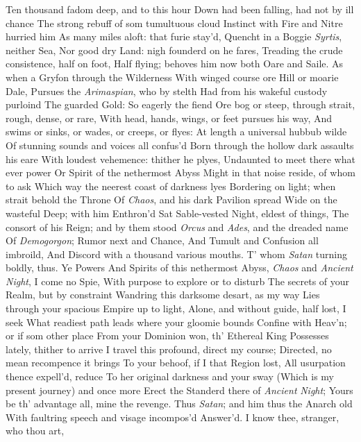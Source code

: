 \documentclass[11pt]{book}
\begin{document}
Ten thousand fadom deep, and to this hour 
Down had been falling, had not by ill chance 
The strong rebuff of som tumultuous cloud 
Instinct with Fire and Nitre hurried him 
As many miles aloft: that furie stay'd, 
Quencht in a Boggie \textit{Syrtis}, neither Sea, 
Nor good dry Land: nigh founderd on he fares, 
Treading the crude consistence, half on foot, 
Half flying; behoves him now both Oare and Saile. 
As when a Gryfon through the Wilderness 
With winged course ore Hill or moarie Dale, 
Pursues the \textit{Arimaspian}, who by stelth 
Had from his wakeful custody purloind 
The guarded Gold: So eagerly the fiend 
Ore bog or steep, through strait, rough, dense, or rare, 
With head, hands, wings, or feet pursues his way, 
And swims or sinks, or wades, or creeps, or flyes: 
At length a universal hubbub wilde 
Of stunning sounds and voices all confus'd 
Born through the hollow dark assaults his eare 
With loudest vehemence: thither he plyes, 
Undaunted to meet there what ever power 
Or Spirit of the nethermost Abyss 
Might in that noise reside, of whom to ask 
Which way the neerest coast of darkness lyes 
Bordering on light; when strait behold the Throne 
Of \textit{Chaos}, and his dark Pavilion spread 
Wide on the wasteful Deep; with him Enthron'd 
Sat Sable-vested Night, eldest of things, 
The consort of his Reign; and by them stood 
\textit{Orcus} and \textit{Ades}, and the dreaded name 
Of \textit{Demogorgon}; Rumor next and Chance, 
And Tumult and Confusion all imbroild, 
And Discord with a thousand various mouths. 
\quad T' whom \textit{Satan} turning boldly, thus.  Ye Powers 
And Spirits of this nethermost Abyss, 
\textit{Chaos} and \textit{Ancient} \textit{Night}, I come no Spie, 
With purpose to explore or to disturb 
The secrets of your Realm, but by constraint 
Wandring this darksome desart, as my way 
Lies through your spacious Empire up to light, 
Alone, and without guide, half lost, I seek 
What readiest path leads where your gloomie bounds 
Confine with Heav'n; or if som other place 
From your Dominion won, th' Ethereal King 
Possesses lately, thither to arrive 
I travel this profound, direct my course; 
Directed, no mean recompence it brings 
To your behoof, if I that Region lost, 
All usurpation thence expell'd, reduce 
To her original darkness and your sway 
(Which is my present journey) and once more 
Erect the Standerd there of \textit{Ancient} \textit{Night}; 
Yours be th' advantage all, mine the revenge. 
\quad Thus \textit{Satan}; and him thus the Anarch old 
With faultring speech and visage incompos'd 
Answer'd.  I know thee, stranger, who thou art, 
\end{document}
